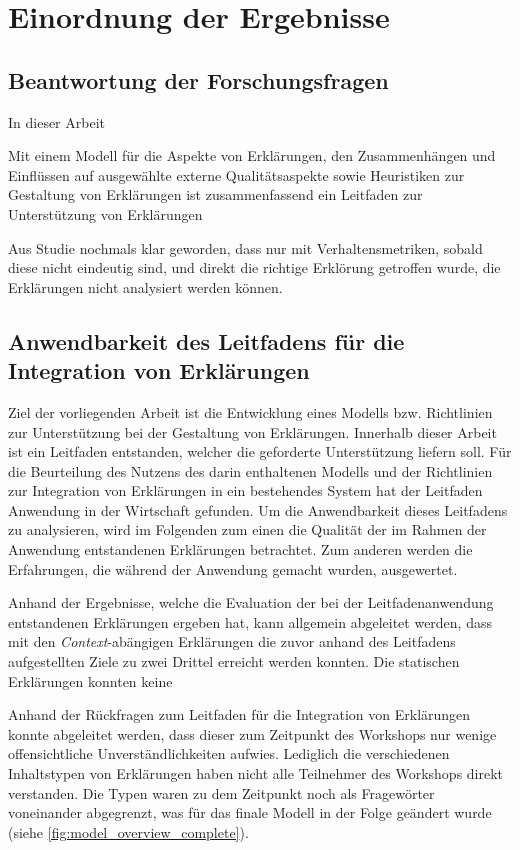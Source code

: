 \section{Einordnung der Ergebnisse}


\subsection*{Beantwortung der Forschungsfragen}

In dieser Arbeit 

Mit einem Modell für die Aspekte von Erklärungen, den Zusammenhängen und Einflüssen auf ausgewählte externe Qualitätsaspekte sowie Heuristiken zur Gestaltung von Erklärungen ist zusammenfassend ein Leitfaden zur Unterstützung von Erklärungen

Aus Studie nochmals klar geworden, dass nur mit Verhaltensmetriken, sobald diese nicht eindeutig sind, und direkt die \glqq richtige\grqq{} Erklörung getroffen wurde, die Erklärungen nicht analysiert werden können.

\subsection*{Anwendbarkeit des Leitfadens für die Integration von Erklärungen}

Ziel der vorliegenden Arbeit ist die Entwicklung eines Modells bzw. Richtlinien zur Unterstützung bei der Gestaltung von Erklärungen. Innerhalb dieser Arbeit ist ein Leitfaden entstanden, welcher die geforderte Unterstützung liefern soll. Für die Beurteilung des Nutzens des darin enthaltenen Modells und der Richtlinien zur Integration von Erklärungen in ein bestehendes System hat der Leitfaden Anwendung in der Wirtschaft gefunden. Um die Anwendbarkeit dieses Leitfadens zu analysieren, wird im Folgenden zum einen die Qualität der im Rahmen der Anwendung entstandenen Erklärungen betrachtet. Zum anderen werden die Erfahrungen, die während der Anwendung gemacht wurden, ausgewertet.

Anhand der Ergebnisse, welche die Evaluation der bei der Leitfadenanwendung entstandenen Erklärungen ergeben hat, kann allgemein abgeleitet werden, dass mit den \textit{Context}-abängigen Erklärungen die zuvor anhand des Leitfadens aufgestellten Ziele zu zwei Drittel erreicht werden konnten. Die statischen Erklärungen konnten keine 


Anhand der Rückfragen zum Leitfaden für die Integration von Erklärungen konnte abgeleitet werden, dass dieser zum Zeitpunkt des Workshops nur wenige offensichtliche Unverständlichkeiten aufwies. Lediglich die verschiedenen Inhaltstypen von Erklärungen haben nicht alle Teilnehmer des Workshops direkt verstanden. Die Typen waren zu dem Zeitpunkt noch als Fragewörter voneinander abgegrenzt, was für das finale Modell in der Folge geändert wurde (siehe \autoref{fig:model_overview_complete}).

